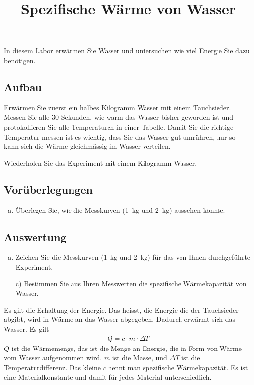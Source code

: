 \documentclass[11pt,a4paper, twosite]{article}
\author{}
\date{}
\title{Spezifische Wärme von Wasser}
\begin{document}
\maketitle

In diesem Labor erwärmen Sie Wasser und untersuchen wie viel Energie Sie dazu benötigen.

\subsection*{Aufbau}
Erwärmen Sie zuerst ein halbes Kilogramm Wasser mit einem Tauchsieder.
Messen Sie alle 30 Sekunden, wie warm das Wasser bisher geworden ist und protokollieren Sie alle Temperaturen in einer Tabelle.
Damit Sie die richtige Temperatur messen ist es wichtig, dass Sie das Wasser gut umrühren, nur so kann sich die Wärme gleichmässig im Wasser verteilen.

Wiederholen Sie das Experiment mit einem Kilogramm Wasser.

\subsection*{Vorüberlegungen}
\begin{enumerate}[a)]
	\item Überlegen Sie, wie die Messkurven (\SI{1}{kg} und \SI{2}{kg}) aussehen könnte.
\end{enumerate}

\subsection*{Auswertung}
\begin{enumerate}[b)]
	\item Zeichen Sie die Messkurven (\SI{1}{kg} und \SI{2}{kg}) für das von Ihnen durchgeführte Experiment.

	\item [c)] Bestimmen Sie aus Ihren Messwerten die spezifische Wärmekapazität von Wasser.
\end{enumerate}



Es gilt die Erhaltung der Energie. Das heisst, die Energie die der Tauchsieder abgibt, wird in Wärme an das Wasser abgegeben.
Dadurch erwärmt sich das Wasser. Es gilt
\begin{eqnarray*}
	Q = c\cdot m\cdot \Delta T
\end{eqnarray*}
$Q$ ist die Wärmemenge, das ist die Menge an Energie, die in Form von Wärme vom Wasser aufgenommen wird.
$m$ ist die Masse, und $\Delta T$ ist die Temperaturdifferenz.
Das kleine $c$ nennt man spezifische Wärmekapazität. Es ist eine Materialkonstante und damit für jedes Material unterschiedlich.
\end{document}
